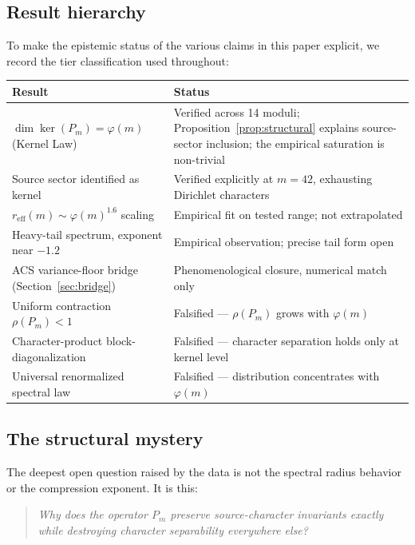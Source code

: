 \documentclass[11pt,a4paper]{article}
\begin{document}
\subsection{Result hierarchy}

To make the epistemic status of the various claims in this paper explicit, we record the tier classification used throughout:

\begin{center}
\begin{tabular}{p{}p{}}
\toprule
\textbf{Result} & \textbf{Status} \\
\midrule
$\dim \ker(P_m) = \varphi(m)$ (Kernel Law) & Verified across 14 moduli; Proposition~\ref{prop:structural} explains source-sector inclusion; the empirical saturation is non-trivial \\
Source sector identified as kernel & Verified explicitly at $m = 42$, exhausting Dirichlet characters \\
$r_{\text{eff}}(m) \sim \varphi(m)^{1.6}$ scaling & Empirical fit on tested range; not extrapolated \\
Heavy-tail spectrum, exponent near $-1.2$ & Empirical observation; precise tail form open \\
ACS variance-floor bridge (Section~\ref{sec:bridge}) & Phenomenological closure, numerical match only \\
Uniform contraction $\rho(P_m) < 1$ & Falsified --- $\rho(P_m)$ grows with $\varphi(m)$ \\
Character-product block-diagonalization & Falsified --- character separation holds only at kernel level \\
Universal renormalized spectral law & Falsified --- distribution concentrates with $\varphi(m)$ \\
\bottomrule
\end{tabular}
\end{center}

\subsection{The structural mystery}

The deepest open question raised by the data is not the spectral radius behavior or the compression exponent. It is this:

\begin{quote}
\emph{Why does the operator $P_m$ preserve source-character invariants exactly while destroying character separability everywhere else?}
\end{quote}
\end{document}
